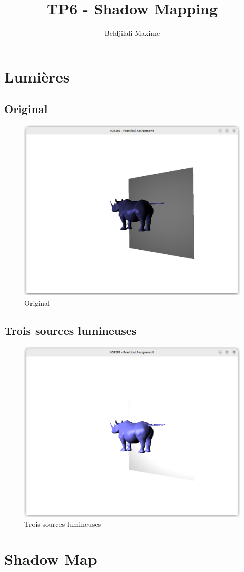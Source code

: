 \documentclass{article}
\title{TP6 - Shadow Mapping}
\author{Beldjilali Maxime}
\begin{document}
\maketitle

\section{Lumières}

\subsection{Original}

\begin{figure}[h]
    \centering
    \includegraphics[width=0.5\linewidth]{images/oneLight.png}
    \caption{Original}
    \label{fig:original}
\end{figure}

\subsection{Trois sources lumineuses}

\begin{figure}[h]
    \centering
    \includegraphics[width=0.5\linewidth]{images/threeLights.png}
    \caption{Trois sources lumineuses}
    \label{fig:threeLights}
\end{figure}

\section{Shadow Map}
\end{document}

